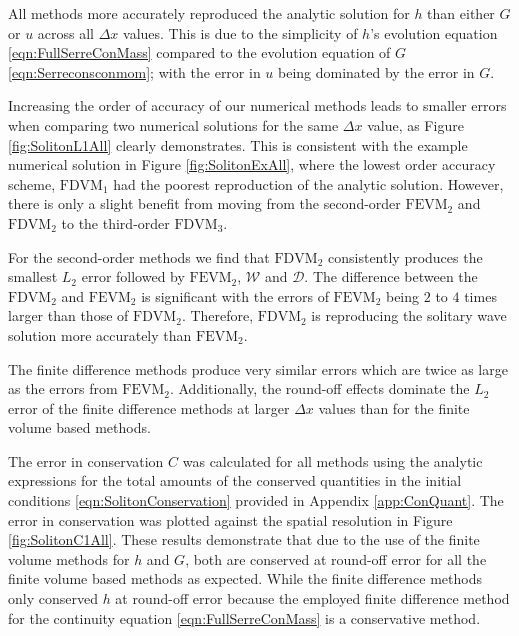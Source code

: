 All methods more accurately reproduced the analytic solution for $h$ than either $G$ or $u$ across all $\Delta x$ values. This is due to the simplicity of $h$'s evolution equation \eqref{eqn:FullSerreConMass} compared to the evolution equation of $G$ \eqref{eqn:Serreconsconmom}; with the error in $u$ being dominated by the error in $G$. 

Increasing the order of accuracy of our numerical methods leads to smaller errors when comparing two numerical solutions for the same $\Delta x$ value, as Figure \ref{fig:SolitonL1All} clearly demonstrates. This is consistent with the example numerical solution in Figure \ref{fig:SolitonExAll}, where the lowest order accuracy scheme, $\text{FDVM}_1$ had the poorest reproduction of the analytic solution. However, there is only a slight benefit from moving from the second-order $\text{FEVM}_2$ and $\text{FDVM}_2$ to the third-order $\text{FDVM}_3$.

For the second-order methods we find that $\text{FDVM}_2$ consistently produces the smallest $L_2$ error followed by $\text{FEVM}_2$, $\mathcal{W}$ and $\mathcal{D}$. The difference between the $\text{FDVM}_2$ and $\text{FEVM}_2$ is significant with the errors of $\text{FEVM}_2$ being $2$ to $4$ times larger than those of $\text{FDVM}_2$. Therefore, $\text{FDVM}_2$ is reproducing the solitary wave solution more accurately than $\text{FEVM}_2$.

The finite difference methods produce very similar errors which are twice as large as the errors from $\text{FEVM}_2$. Additionally, the round-off effects dominate the $L_2$ error of the finite difference methods at larger $\Delta x$ values than for the finite volume based methods.

The error in conservation $C$ was calculated for all methods using the analytic expressions for the total amounts of the conserved quantities in the initial conditions \eqref{eqn:SolitonConservation} provided in Appendix \ref{app:ConQuant}. The error in conservation was plotted against the spatial resolution in Figure \ref{fig:SolitonC1All}. These results demonstrate that due to the use of the finite volume methods for $h$ and $G$, both are conserved at round-off error for all the finite volume based methods as expected. While the finite difference methods only conserved $h$ at round-off error because the employed finite difference method for the continuity equation \eqref{eqn:FullSerreConMass} is a conservative method. 

